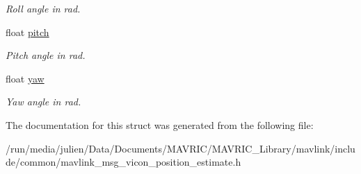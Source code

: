 \begin{DoxyCompactItemize}
\begin{DoxyCompactList}\small\item\em Roll angle in rad. \end{DoxyCompactList}\item 
\hypertarget{struct____mavlink__vicon__position__estimate__t_ac65d824a08fcaad66059ebecaf70ab87}{float \hyperlink{struct____mavlink__vicon__position__estimate__t_ac65d824a08fcaad66059ebecaf70ab87}{pitch}}\label{struct____mavlink__vicon__position__estimate__t_ac65d824a08fcaad66059ebecaf70ab87}

\begin{DoxyCompactList}\small\item\em Pitch angle in rad. \end{DoxyCompactList}\item 
\hypertarget{struct____mavlink__vicon__position__estimate__t_a0e0822aace81ee61ff76a034172e4a3c}{float \hyperlink{struct____mavlink__vicon__position__estimate__t_a0e0822aace81ee61ff76a034172e4a3c}{yaw}}\label{struct____mavlink__vicon__position__estimate__t_a0e0822aace81ee61ff76a034172e4a3c}

\begin{DoxyCompactList}\small\item\em Yaw angle in rad. \end{DoxyCompactList}\end{DoxyCompactItemize}


The documentation for this struct was generated from the following file\+:\begin{DoxyCompactItemize}
\item 
/run/media/julien/\+Data/\+Documents/\+M\+A\+V\+R\+I\+C/\+M\+A\+V\+R\+I\+C\+\_\+\+Library/mavlink/include/common/mavlink\+\_\+msg\+\_\+vicon\+\_\+position\+\_\+estimate.\+h\end{DoxyCompactItemize}
